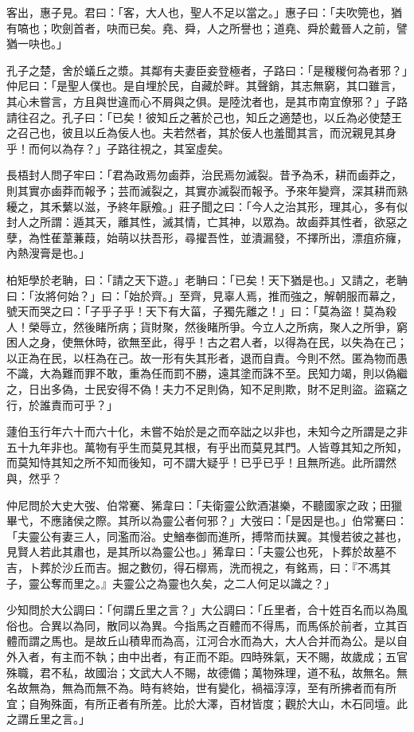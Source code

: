 \begin{pinyinscope}
客出，惠子見。君曰：「客，大人也，聖人不足以當之。」惠子曰：「夫吹筦也，猶有嗃也；吹劍首者，吷而已矣。堯、舜，人之所譽也；道堯、舜於戴晉人之前，譬猶一吷也。」

孔子之楚，舍於蟻丘之漿。其鄰有夫妻臣妾登極者，子路曰：「是稯稯何為者邪？」仲尼曰：「是聖人僕也。是自埋於民，自藏於畔。其聲銷，其志無窮，其口雖言，其心未嘗言，方且與世違而心不屑與之俱。是陸沈者也，是其市南宜僚邪？」子路請往召之。孔子曰：「已矣！彼知丘之著於己也，知丘之適楚也，以丘為必使楚王之召己也，彼且以丘為佞人也。夫若然者，其於佞人也羞聞其言，而況親見其身乎！而何以為存？」子路往視之，其室虛矣。

長梧封人問子牢曰：「君為政焉勿鹵莽，治民焉勿滅裂。昔予為禾，耕而鹵莽之，則其實亦鹵莽而報予；芸而滅裂之，其實亦滅裂而報予。予來年變齊，深其耕而熟耰之，其禾蘩以滋，予終年厭飧。」莊子聞之曰：「今人之治其形，理其心，多有似封人之所謂：遁其天，離其性，滅其情，亡其神，以眾為。故鹵莽其性者，欲惡之孽，為性萑葦蒹葭，始萌以扶吾形，尋擢吾性，並潰漏發，不擇所出，漂疽疥癕，內熱溲膏是也。」

柏矩學於老聃，曰：「請之天下遊。」老聃曰：「已矣！天下猶是也。」又請之，老聃曰：「汝將何始？」曰：「始於齊。」至齊，見辜人焉，推而強之，解朝服而幕之，號天而哭之曰：「子乎子乎！天下有大菑，子獨先離之！」曰：「莫為盜！莫為殺人！榮辱立，然後睹所病；貨財聚，然後睹所爭。今立人之所病，聚人之所爭，窮困人之身，使無休時，欲無至此，得乎！古之君人者，以得為在民，以失為在己；以正為在民，以枉為在己。故一形有失其形者，退而自責。今則不然。匿為物而愚不識，大為難而罪不敢，重為任而罰不勝，遠其塗而誅不至。民知力竭，則以偽繼之，日出多偽，士民安得不偽！夫力不足則偽，知不足則欺，財不足則盜。盜竊之行，於誰責而可乎？」

蘧伯玉行年六十而六十化，未嘗不始於是之而卒詘之以非也，未知今之所謂是之非五十九年非也。萬物有乎生而莫見其根，有乎出而莫見其門。人皆尊其知之所知，而莫知恃其知之所不知而後知，可不謂大疑乎！已乎已乎！且無所逃。此所謂然與，然乎？

仲尼問於大史大弢、伯常騫、狶韋曰：「夫衛靈公飲酒湛樂，不聽國家之政；田獵畢弋，不應諸侯之際。其所以為靈公者何邪？」大弢曰：「是因是也。」伯常騫曰：「夫靈公有妻三人，同濫而浴。史鰌奉御而進所，搏幣而扶翼。其慢若彼之甚也，見賢人若此其肅也，是其所以為靈公也。」狶韋曰：「夫靈公也死，卜葬於故墓不吉，卜葬於沙丘而吉。掘之數仞，得石槨焉，洗而視之，有銘焉，曰：『不馮其子，靈公奪而里之。』夫靈公之為靈也久矣，之二人何足以識之？」

少知問於大公調曰：「何謂丘里之言？」大公調曰：「丘里者，合十姓百名而以為風俗也。合異以為同，散同以為異。今指馬之百體而不得馬，而馬係於前者，立其百體而謂之馬也。是故丘山積卑而為高，江河合水而為大，大人合并而為公。是以自外入者，有主而不執；由中出者，有正而不距。四時殊氣，天不賜，故歲成；五官殊職，君不私，故國治；文武大人不賜，故德備；萬物殊理，道不私，故無名。無名故無為，無為而無不為。時有終始，世有變化，禍福淳淳，至有所拂者而有所宜；自殉殊面，有所正者有所差。比於大澤，百材皆度；觀於大山，木石同壇。此之謂丘里之言。」


\end{pinyinscope}
